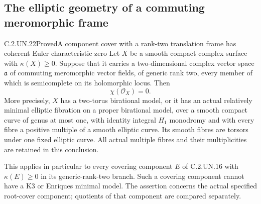 \subsection{The elliptic geometry of a commuting meromorphic frame}

\begin{statement}{C.2.UN.22}{Proved}{A component cover with a rank-two translation frame has coherent Euler characteristic zero}
Let $X$ be a smooth compact complex surface with
$\kappa(X)\ge0$. Suppose that it carries a two-dimensional
complex vector space $\mathfrak a$ of commuting meromorphic
vector fields, of generic rank two, every member of which
is semicomplete on its holomorphic locus. Then
\[
                         \chi(\mathcal O_X)=0.
                                                               \tag{C.RF.5}
\]
More precisely, $X$ has a two-torus birational model,
or it has an actual relatively minimal elliptic fibration
on a proper birational model, over a smooth compact curve
of genus at most one, with identity integral $H_1$ monodromy
and with every fibre a positive multiple of a smooth elliptic
curve. Its smooth fibres are torsors under one fixed elliptic
curve. All actual multiple fibres and their multiplicities
are retained in this conclusion.

This applies in particular to every covering component
$E$ of C.2.UN.16 with $\kappa(E)\ge0$ in its
generic-rank-two branch. Such a covering component cannot
have a K3 or Enriques minimal model. The assertion concerns
the actual specified root-cover component; quotients of that
component are compared separately.
\end{statement}

